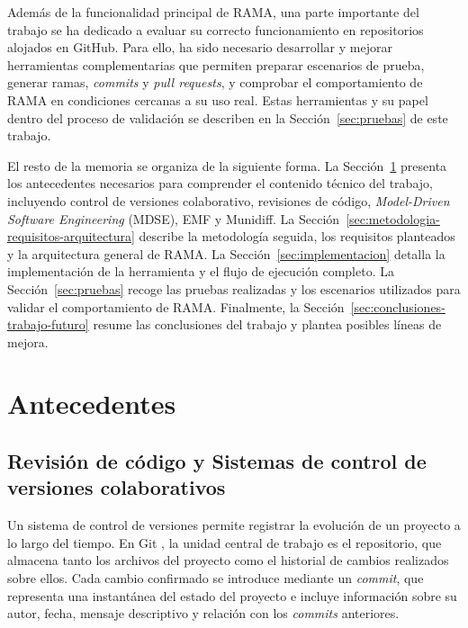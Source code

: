 \documentclass[11pt]{article}
\begin{document}
Además de la funcionalidad principal de RAMA, una parte importante del trabajo se ha dedicado a evaluar su correcto funcionamiento en repositorios alojados en GitHub. Para ello, ha sido necesario desarrollar y mejorar herramientas complementarias que permiten preparar escenarios de prueba, generar ramas, \textit{commits} y \textit{pull requests}, y comprobar el comportamiento de RAMA en condiciones cercanas a su uso real. Estas herramientas y su papel dentro del proceso de validación se describen en la Sección~\ref{sec:pruebas} de este trabajo.

El resto de la memoria se organiza de la siguiente forma. La Sección~\ref{sec:antecedentes} presenta los antecedentes necesarios para comprender el contenido técnico del trabajo, incluyendo control de versiones colaborativo, revisiones de código, \textit{Model-Driven Software Engineering} (MDSE), EMF y Munidiff. La Sección~\ref{sec:metodologia-requisitos-arquitectura} describe la metodología seguida, los requisitos planteados y la arquitectura general de RAMA. La Sección~\ref{sec:implementacion} detalla la implementación de la herramienta y el flujo de ejecución completo. La Sección~\ref{sec:pruebas} recoge las pruebas realizadas y los escenarios utilizados para validar el comportamiento de RAMA. Finalmente, la Sección~\ref{sec:conclusiones-trabajo-futuro} resume las conclusiones del trabajo y plantea posibles líneas de mejora.

\newpage

\section{Antecedentes}
\label{sec:antecedentes}

\subsection{Revisión de código y Sistemas de control de versiones colaborativos}

Un sistema de control de versiones permite registrar la evolución de un proyecto a lo largo del tiempo. En Git \cite{progit}, la unidad central de trabajo es el repositorio, que almacena tanto los archivos del proyecto como el historial de cambios realizados sobre ellos. Cada cambio confirmado se introduce mediante un \textit{commit}, que representa una instantánea del estado del proyecto e incluye información sobre su autor, fecha, mensaje descriptivo y relación con los \textit{commits} anteriores.
\end{document}

